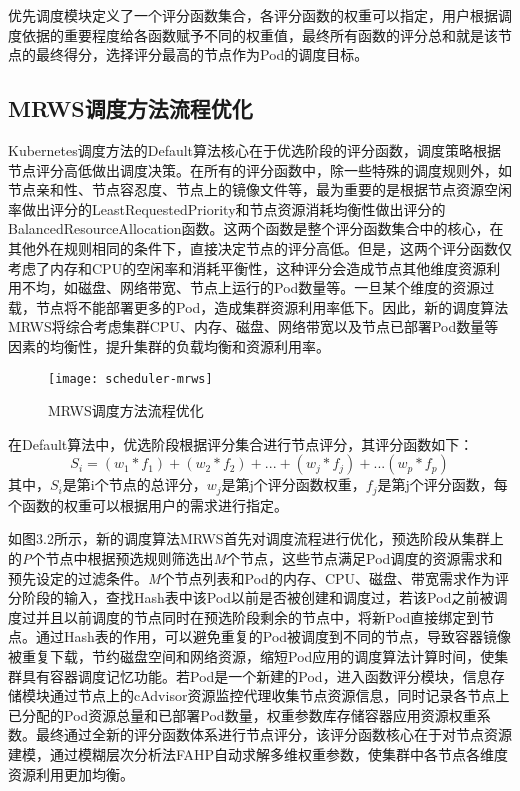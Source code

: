 优先调度模块定义了一个评分函数集合，各评分函数的权重可以指定，用户根据调度依据的重要程度给各函数赋予不同的权重值，最终所有函数的评分总和就是该节点的最终得分，选择评分最高的节点作为Pod的调度目标。

\subsection{MRWS调度方法流程优化}
Kubernetes调度方法的Default算法核心在于优选阶段的评分函数，调度策略根据节点评分高低做出调度决策。在所有的评分函数中，除一些特殊的调度规则外，如节点亲和性、节点容忍度、节点上的镜像文件等，最为重要的是根据节点资源空闲率做出评分的LeastRequestedPriority和节点资源消耗均衡性做出评分的BalancedResourceAllocation函数。这两个函数是整个评分函数集合中的核心，在其他外在规则相同的条件下，直接决定节点的评分高低。但是，这两个评分函数仅考虑了内存和CPU的空闲率和消耗平衡性，这种评分会造成节点其他维度资源利用不均，如磁盘、网络带宽、节点上运行的Pod数量等。一旦某个维度的资源过载，节点将不能部署更多的Pod，造成集群资源利用率低下。因此，新的调度算法MRWS将综合考虑集群CPU、内存、磁盘、网络带宽以及节点已部署Pod数量等因素的均衡性，提升集群的负载均衡和资源利用率。
\begin{figure}[H] %
	\centering
	\texttt{[image: scheduler-mrws]}
	\caption{MRWS调度方法流程优化}
\end{figure}
在Default算法中，优选阶段根据评分集合进行节点评分，其评分函数如下：
\begin{equation}
	S_{i} = (w_{1}*f_{1})+(w_{2}*f_{2})+...+(w_{j}*f_{j})+...(w_{p}*f_{p})
\end{equation}
其中，\begin{math}S_{i}\end{math}是第i个节点的总评分，\begin{math}w_{j}\end{math}是第j个评分函数权重，\begin{math}f_{j}\end{math}是第j个评分函数，每个函数的权重可以根据用户的需求进行指定。

如图3.2所示，新的调度算法MRWS首先对调度流程进行优化，预选阶段从集群上的\emph{P}个节点中根据预选规则筛选出\emph{M}个节点，这些节点满足Pod调度的资源需求和预先设定的过滤条件。\emph{M}个节点列表和Pod的内存、CPU、磁盘、带宽需求作为评分阶段的输入，查找Hash表中该Pod以前是否被创建和调度过，若该Pod之前被调度过并且以前调度的节点同时在预选阶段剩余的节点中，将新Pod直接绑定到节点。通过Hash表的作用，可以避免重复的Pod被调度到不同的节点，导致容器镜像被重复下载，节约磁盘空间和网络资源，缩短Pod应用的调度算法计算时间，使集群具有容器调度记忆功能。若Pod是一个新建的Pod，进入函数评分模块，信息存储模块通过节点上的cAdvisor资源监控代理收集节点资源信息，同时记录各节点上已分配的Pod资源总量和已部署Pod数量，权重参数库存储容器应用资源权重系数。最终通过全新的评分函数体系进行节点评分，该评分函数核心在于对节点资源建模，通过模糊层次分析法FAHP自动求解多维权重参数，使集群中各节点各维度资源利用更加均衡。


